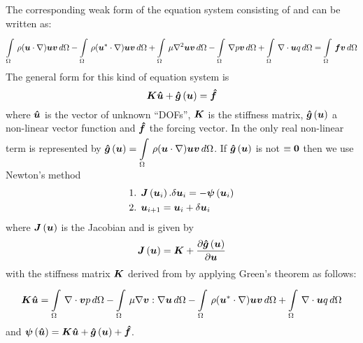 The corresponding weak form of the equation system consisting of  and  can be written as:
\begin{equation}
  \gint{\Omega}{}{\rho(\vectr{u}\cdot\grad)\vectr{u}\vectr{v} }{\Omega}
  -\gint{\Omega}{}{\rho(\vectr{u}^*\cdot\grad)\vectr{u}\vectr{v} }{\Omega}
  +\gint{\Omega}{}{\mu\laplacian{\vectr{u}}\vectr{v}}{\Omega}
  -\gint{\Omega}{}{\gradient{}{p}\vectr{v}}{\Omega}
  +\gint{\Omega}{}{\grad\cdot \vectr{u}q}{\Omega}=
  \gint{\Omega}{}{\vectr{f}\vectr{v}}{\Omega}  
  \label{eqn:NavierStokesweakform}
\end{equation}
The general form for this kind of equation system is
\begin{equation}
  \matr{K}{\vectr{\hat{u}}}+
  \fnof{\vectr{\hat{g}}}{{\vectr{{u}}}}={\vectr{\hat{f}}}
  \label{eqn:NavierStokesequationALE2general}
\end{equation}
where ${\boldsymbol{\hat{u}}}$ is the vector of unknown ``DOFs'', $\matr{K}$ is the
stiffness matrix, $ \boldsymbol{\hat{g}}\left( {\boldsymbol{{u}}} \right) $ a non-linear vector
function and ${\boldsymbol{\hat{f}}}$ the forcing vector. In  the only real non-linear term is represented by $ \boldsymbol{\hat{g}}\left( \boldsymbol{{u}} \right) =  \displaystyle\int\limits_{\Omega}^{} \,\rho(\boldsymbol{u}\cdot\nabla)\boldsymbol{u}\boldsymbol{v} \,d\Omega $.
If $ \boldsymbol{\hat{g}}\left( \boldsymbol{u} \right) $ is not $\equiv\boldsymbol{0}$ then we use Newton's method \ie
\begin{equation}
  \begin{split}
    \text{1.  } & \fnof{\matr{J}}{\vectr{u}_{i}}.\delta
    \vectr{u}_{i} = 
    -\fnof{\vectr{\psi}}{\vectr{u}_{i}} \\
    \text{2.  } & \vectr{u}_{i+1}=\vectr{u}_{i}+\delta
    \vectr{u}_{i}
  \end{split}
\end{equation}
where $\fnof{\matr{J}}{\vectr{u}}$ is the Jacobian and is given by
\begin{equation}
  \fnof{\matr{J}}{\vectr{u}}=\matr{K}+
    \delby{\fnof{\vectr{\hat{g}}}{\vectr{u}}}{\vectr{u}}
\end{equation}
with the stiffness matrix $\matr{K}$ derived from  by applying Green's theorem as follows:
\begin{equation}
  \begin{split}
  \matr{K}\vectr{\hat{u}}=
  \gint{\Omega}{}{\grad\cdot\vectr{v}p}{\Omega}
  -\gint{\Omega}{}{\mu\grad\vectr{v}:\grad\vectr{u}}{\Omega}
  -\gint{\Omega}{}{\rho(\vectr{u}^*\cdot\grad)\vectr{u}\vectr{v}}{\Omega}
  +\gint{\Omega}{}{\grad\cdot \vectr{u}q}{\Omega}
  \end{split}
  \label{eqn:NavierStokesweakform2}
\end{equation}
and $\fnof{\vectr{\psi}}{\vectr{\hat{u}}}=\matr{K}\vectr{\hat{u}}+\fnof{\vectr{\hat{g}}}{\vectr{u}}+\vectr{\hat{f}}$.


